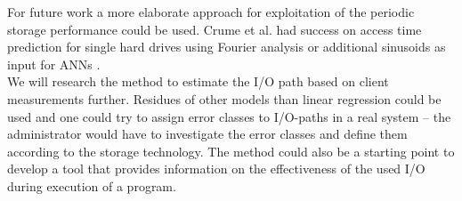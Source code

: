 \documentclass{superfri}
\begin{document}
For future work a more elaborate approach for exploitation of the periodic storage performance could be used. 
Crume et al. had success on access time prediction for single hard drives using Fourier analysis \cite{Crume:2013:FML:2538542.2538561} or additional sinusoids as input for ANNs \cite{crumelatent}.\\
We will research the method to estimate the I/O path based on client measurements further.
Residues of other models than linear regression could be used and one could try to assign error classes to I/O-paths in a real system -- the administrator would have to investigate the error classes and define them according to the storage technology.
The method could also be a starting point to develop a tool that provides information on the effectiveness of the used I/O during execution of a program.

\openaccess



\end{document}
